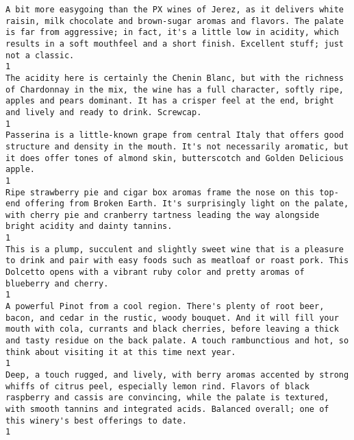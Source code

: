 \documentclass[11pt]{article}
\begin{document}
\begin{Verbatim}[commandchars=\\\{\}]
A bit more easygoing than the PX wines of Jerez, as it delivers white raisin, milk chocolate and brown-sugar aromas and flavors. The palate is far from aggressive; in fact, it's a little low in acidity, which results in a soft mouthfeel and a short finish. Excellent stuff; just not a classic.                                                                                                          1
The acidity here is certainly the Chenin Blanc, but with the richness of Chardonnay in the mix, the wine has a full character, softly ripe, apples and pears dominant. It has a crisper feel at the end, bright and lively and ready to drink. Screwcap.                                                                                                                                                       1
Passerina is a little-known grape from central Italy that offers good structure and density in the mouth. It's not necessarily aromatic, but it does offer tones of almond skin, butterscotch and Golden Delicious apple.                                                                                                                                                                                      1
Ripe strawberry pie and cigar box aromas frame the nose on this top-end offering from Broken Earth. It's surprisingly light on the palate, with cherry pie and cranberry tartness leading the way alongside bright acidity and dainty tannins.                                                                                                                                                                 1
This is a plump, succulent and slightly sweet wine that is a pleasure to drink and pair with easy foods such as meatloaf or roast pork. This Dolcetto opens with a vibrant ruby color and pretty aromas of blueberry and cherry.                                                                                                                                                                               1
A powerful Pinot from a cool region. There's plenty of root beer, bacon, and cedar in the rustic, woody bouquet. And it will fill your mouth with cola, currants and black cherries, before leaving a thick and tasty residue on the back palate. A touch rambunctious and hot, so think about visiting it at this time next year.                                                                             1
Deep, a touch rugged, and lively, with berry aromas accented by strong whiffs of citrus peel, especially lemon rind. Flavors of black raspberry and cassis are convincing, while the palate is textured, with smooth tannins and integrated acids. Balanced overall; one of this winery's best offerings to date.                                                                                              1

\end{Verbatim}
\end{document}
